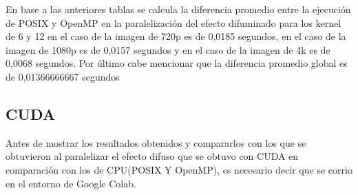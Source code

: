 \documentclass{IEEEtran}
\begin{document}
En base a las anteriores tablas se  calcula la diferencia promedio entre la ejecución de POSIX y OpenMP en la paralelización del efecto difuminado para los kernel de 6 y 12 en el caso de la imagen de 720p es de 0,0185 segundos, en el caso de la imagen de 1080p es de 0,0157 segundos y en el caso de la imagen de 4k es de 0,0068 segundos. Por último cabe mencionar que la diferencia promedio global es de 0,01366666667 segundos

\subsection{CUDA}
Antes de mostrar los resultados obtenidos y compararlos con los que se obtuvieron al paralelizar el efecto difuso que se obtuvo con CUDA en comparación con los de CPU(POSIX Y OpenMP), es necesario decir que se corrio en el entorno de Google Colab. 
\end{document}
